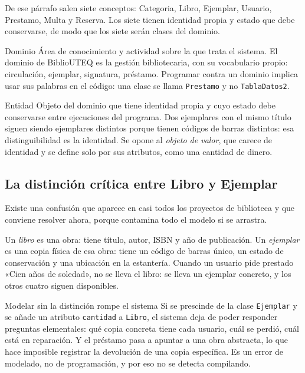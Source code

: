 \documentclass[11pt,a4paper,openany]{book}
\begin{document}
De ese párrafo salen siete conceptos: Categoria, Libro, Ejemplar, Usuario, Prestamo, Multa y Reserva. Los siete tienen identidad propia y estado que debe conservarse, de modo que los siete serán clases del dominio.

\begin{cajadefinicion}{Dominio}
	Área de conocimiento y actividad sobre la que trata el sistema. El dominio de BiblioUTEQ es la gestión bibliotecaria, con su vocabulario propio: circulación, ejemplar, signatura, préstamo. Programar contra un dominio implica usar sus palabras en el código: una clase se llama \texttt{Prestamo} y no \texttt{TablaDatos2}.
\end{cajadefinicion}

\begin{cajadefinicion}{Entidad}
	Objeto del dominio que tiene identidad propia y cuyo estado debe conservarse entre ejecuciones del programa. Dos ejemplares con el mismo título siguen siendo ejemplares distintos porque tienen códigos de barras distintos: esa distinguibilidad es la identidad. Se opone al \emph{objeto de valor}, que carece de identidad y se define solo por sus atributos, como una cantidad de dinero.
\end{cajadefinicion}

\subsection{La distinción crítica entre Libro y Ejemplar}
\label{sec:libro-ejemplar}

Existe una confusión que aparece en casi todos los proyectos de biblioteca y que conviene resolver ahora, porque contamina todo el modelo si se arrastra.

Un \emph{libro} es una obra: tiene título, autor, ISBN y año de publicación. Un \emph{ejemplar} es una copia física de esa obra: tiene un código de barras único, un estado de conservación y una ubicación en la estantería. Cuando un usuario pide prestado «Cien años de soledad», no se lleva el libro: se lleva un ejemplar concreto, y los otros cuatro siguen disponibles.

\begin{cajaadvertencia}{Modelar sin la distinción rompe el sistema}
	Si se prescinde de la clase \texttt{Ejemplar} y se añade un atributo \texttt{cantidad} a \texttt{Libro}, el sistema deja de poder responder preguntas elementales: qué copia concreta tiene cada usuario, cuál se perdió, cuál está en reparación. Y el préstamo pasa a apuntar a una obra abstracta, lo que hace imposible registrar la devolución de una copia específica. Es un error de modelado, no de programación, y por eso no se detecta compilando.
\end{cajaadvertencia}
\end{document}
